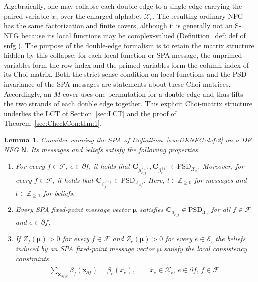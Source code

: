 \documentclass[journal]{IEEEtran}
\newcommand{\add}[1]{{\color{black}#1}}
\newtheorem{lemma}[theorem]{Lemma}
\newcommand{\vect}[1]{ \bm{#1} }
\newcommand{\set}[1]{\mathcal{#1}}
\newcommand{\beli}{\beta}
\newcommand{\setEfull}{ \mathcal{E} }
\newcommand{\setF}{ \mathcal{F} }
\newcommand{\setpf}{ \partial f }
\newcommand{\vmu}{ \vect{ \mu } }
\newcommand{\graphN}{ \mathsf{N} }
\newcommand{\setPSD}[1]{ \mathrm{PSD}_{#1} }
\newcommand{\sZp}{ \mathbb{Z}_{\geq 0} }
\newcommand{\sZpp}{ \mathbb{Z}_{\geq 1} }
\newcommand{\tset}[1]{\tilde{\mathcal{#1}}}
\newcommand{\matr}[1]{\vect{#1}}
\newcommand{\ef}{ e,f }
\newcommand{\tx}{ \tilde{x} }
\newcommand{\txe}{ \tilde{x}_{e} }
\newcommand{\tvx}{ \tilde{\vect{x}}  }
\begin{document}
\add{Algebraically, one may collapse each double edge to a single edge
  carrying the paired variable $\txe$ over the enlarged alphabet
  $\tset{X}_e$. The resulting ordinary NFG has the same factorization and
  finite covers, although it is generally not an S-NFG because its local
  functions may be complex-valued (Definition~\ref{def: def of snfg}). The
  purpose of the double-edge formalism is to retain the matrix structure
  hidden by this collapse: for each local function or SPA message, the
  unprimed variables form the row index and the primed variables form the
  column index of its Choi matrix. Both the strict-sense condition on local
  functions and the PSD invariance of the SPA messages are statements about
  these Choi matrices. Accordingly, an $M$-cover uses one permutation for a
  double edge and thus lifts the two strands of each double edge
  together. This explicit Choi-matrix structure underlies the LCT of
  Section~\ref{sec:LCT} and the proof of Theorem~\ref{sec:CheckCon:thm:1}.}

\begin{lemma}
  \label{sec:DENFG:lem:1}
  \add{Consider running the SPA of Definition~\ref{sec:DENFG:def:2} on a
    DE-NFG $\graphN$. Its messages and beliefs satisfy the following
    properties.}
  \begin{enumerate}

    \item\label{sec:DENFG:lem:1:item:1} \add{For every $f\!\in\!\setF$,
            $e\!\in\!\setpf$, it holds that
            $\matr{C}_{\mu_{\ef}^{(t)}}, \matr{C}_{\beli_e^{(t)}} \in
              \setPSD{\set{X}_e}$. Moreover, for every $f\in\setF$, it holds that
            $\matr{C}_{\beli_f^{(t)}}\in \setPSD{\set{X}_{\setpf}}$. Here,
            $t\in\sZp$ for messages and $t\in\sZpp$ for beliefs.}

    \item\label{sec:DENFG:lem:1: PSD of SPA fixed point message} \add{Every
            SPA fixed-point message vector $ \vmu $ satisfies
            $ \matr{C}_{\mu_{\ef}} \in \setPSD{\set{X}_{e}} $ for all
            $ f \in \setF $ and $ e \in \setpf $.}

    \item\label{sec:DENFG:lem:1:item:2} \add{If $Z_f(\vmu)>0$ for every
            $f\in\setF$ and $Z_e(\vmu)>0$ for every $e\in\setEfull$,} the beliefs
          induced by an SPA fixed-point message vector $\vmu$ satisfy the local
          consistency constraints
          \begin{align*}
            \sum_{ \tvx_{\setpf \setminus e} }
            \beli_f(\tvx_{\setpf})
            = \beli_{e}(\tx_{e}), \qquad
            \txe \in \tset{X}_{e}, \, e \in \setpf,\, f \in \setF.
          \end{align*}
  \end{enumerate}
\end{lemma}
\end{document}
